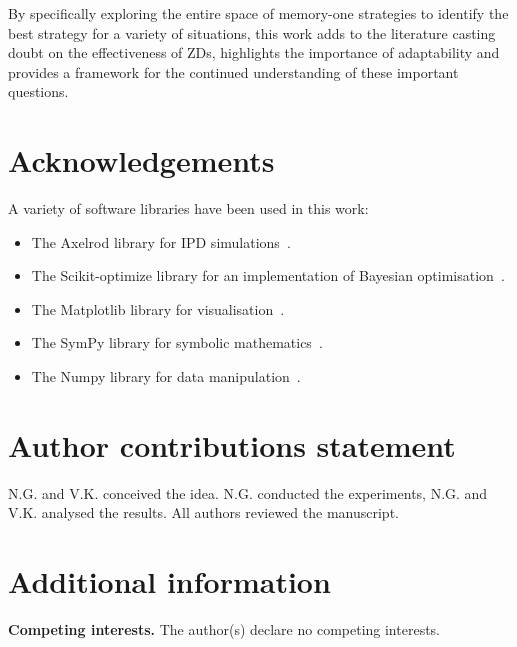 \documentclass[fleqn,10pt]{wlscirep}
\begin{document}
By specifically exploring the entire space of memory-one strategies to identify
the best strategy for a variety of situations, this work adds to the literature
casting doubt
on the effectiveness of ZDs, highlights the importance of adaptability and provides
a framework for the continued understanding of these important questions.



\section*{Acknowledgements}

A variety of software libraries have been used in this work:

\begin{itemize}
    \item The Axelrod library for IPD simulations~\cite{axelrodproject}.
    \item The Scikit-optimize library for an implementation of Bayesian optimisation~\cite{tim_head_2018_1207017}.
    \item The Matplotlib library for visualisation~\cite{hunter2007matplotlib}.
    \item The SymPy library for symbolic mathematics~\cite{sympy}.
    \item The Numpy library for data manipulation~\cite{walt2011numpy}.
\end{itemize}

\section*{Author contributions statement}

N.G. and V.K. conceived the idea. N.G. conducted the experiments, N.G. and V.K.
analysed the results. All authors reviewed the manuscript.

\section*{Additional information}

\textbf{Competing interests.} The author(s) declare no competing interests.
\end{document}
